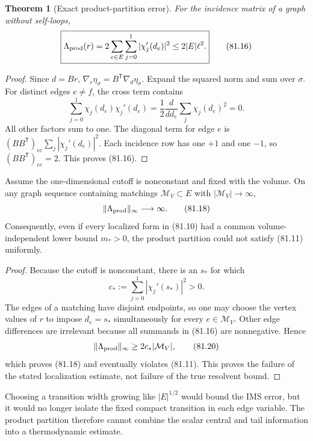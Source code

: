 \documentclass[11pt]{article}
\newtheorem{theorem}{Theorem}[section]
\theoremstyle{remark}
\begin{document}
\begin{theorem}[Exact product-partition error]
\label{thm:v17v81-product}
For the incidence matrix of a graph without self-loops,
\[
\boxed{
 \Lambda_{\rm prod}(r)
 =2\sum_{e\in E}\sum_{j=0}^1|\chi_j'(d_e)|^2
 \leq2|E|\ell^2.}                                \tag{81.16}
\]
\end{theorem}

\begin{proof}
Since \(d=Br\),
\(\nabla_r\eta_\sigma=B^{\mathsf T}\nabla_d\eta_\sigma\).  Expand
the squared norm and sum over \(\sigma\).  For distinct edges
\(e\neq f\), the cross term contains
\[
 \sum_{j=0}^1\chi_j(d_e)\chi_j'(d_e)
 =\frac12\frac d{dd_e}\sum_j\chi_j(d_e)^2=0.     \tag{81.17}
\]
All other factors sum to one.  The diagonal term for edge \(e\) is
\((BB^{\mathsf T})_{ee}\sum_j|\chi_j'(d_e)|^2\).
Each incidence row has one \(+1\) and one \(-1\), so
\((BB^{\mathsf T})_{ee}=2\).  This proves (81.16).
\end{proof}

\begin{countertheorem}
\label{ctr:v17v81-volume}
Assume the one-dimensional cutoff is nonconstant and fixed with the
volume.  On any graph sequence containing matchings
\(\mathcal M_V\subset E\) with \(|\mathcal M_V|\to\infty\),
\[
 \|\Lambda_{\rm prod}\|_\infty\longrightarrow\infty.            \tag{81.18}
\]
Consequently, even if every localized form in (81.10) had a common
volume-independent lower bound \(m_*>0\), the product partition could
not satisfy (81.11) uniformly.
\end{countertheorem}

\begin{proof}
Because the cutoff is nonconstant, there is an \(s_*\) for which
\[
 c_*:=\sum_{j=0}^1|\chi_j'(s_*)|^2>0.             \tag{81.19}
\]
The edges of a matching have disjoint endpoints, so one may choose the
vertex values of \(r\) to impose \(d_e=s_*\) simultaneously for every
\(e\in\mathcal M_V\).  Other edge differences are irrelevant because
all summands in (81.16) are nonnegative.  Hence
\[
 \|\Lambda_{\rm prod}\|_\infty
 \geq2c_*|\mathcal M_V|,                          \tag{81.20}
\]
which proves (81.18) and eventually violates (81.11).  This proves the
failure of the stated localization estimate, not failure of the true
resolvent bound.
\end{proof}

Choosing a transition width growing like \(|E|^{1/2}\) would bound the
IMS error, but it would no longer isolate the fixed compact transition
in each edge variable.  The product partition therefore cannot combine
the scalar central and tail information into a thermodynamic estimate.
\end{document}

